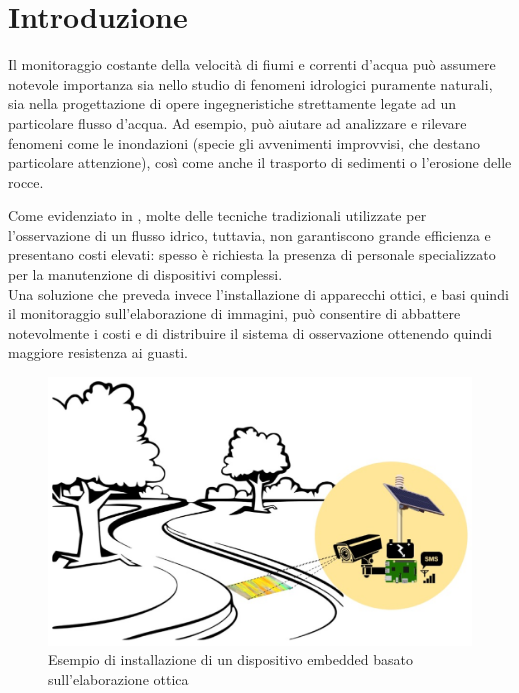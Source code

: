 \chapter{Introduzione}

Il monitoraggio costante della velocità di fiumi e correnti d'acqua può assumere notevole importanza sia nello studio di 
fenomeni idrologici puramente naturali, sia nella progettazione di opere ingegneristiche strettamente legate ad un 
particolare flusso d'acqua. Ad esempio, può aiutare ad analizzare e rilevare fenomeni come le inondazioni (specie gli 
avvenimenti improvvisi, che destano particolare attenzione), così come anche il trasporto di sedimenti o 
l'erosione delle rocce.

Come evidenziato in \cite{rs10122010}, molte delle tecniche tradizionali utilizzate per l'osservazione di un flusso idrico, tuttavia, non garantiscono 
grande efficienza e presentano costi elevati: spesso è richiesta la presenza di personale specializzato per la 
manutenzione di dispositivi complessi.\\ %
Una soluzione che preveda invece l'installazione di apparecchi ottici, e basi quindi il monitoraggio sull'elaborazione di
immagini, può consentire di abbattere notevolmente i costi e di distribuire il sistema di osservazione ottenendo quindi 
maggiore resistenza ai guasti.%

\begin{figure}[h!]
    \begin{center}
        \includegraphics[scale=0.2]{img/otv_real_use.png}
        \caption{Esempio di installazione di un dispositivo embedded basato sull'elaborazione ottica}
    \end{center}
\end{figure}

